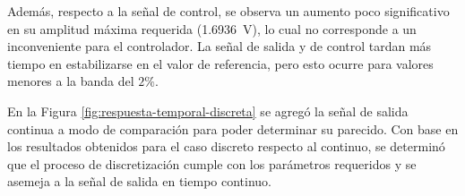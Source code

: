Además, respecto a la señal de control, se observa un aumento poco significativo en su amplitud máxima requerida (\SI{1.6936}{\volt}), lo cual no corresponde a un inconveniente para el controlador.
La señal de salida y de control tardan más tiempo en estabilizarse en el valor de referencia, pero esto ocurre para valores menores a la banda del $2\%$.

En la Figura \ref{fig:respuesta-temporal-discreta} se agregó la señal de salida continua a modo de comparación para poder determinar su parecido.
Con base en los resultados obtenidos para el caso discreto respecto al continuo, se determinó que el proceso de discretización cumple con los parámetros requeridos y se asemeja a la señal de salida en tiempo continuo.

